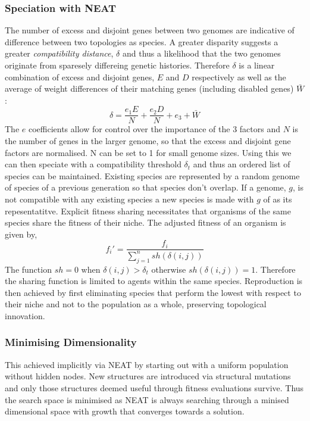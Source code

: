 \documentclass{article}
\begin{document}
\subsubsection*{Speciation with NEAT}
The number of excess and disjoint genes between two genomes are indicative of difference between two topologies as species.
A greater disparity suggests a greater \emph{compatibility distance}, $\delta$ and thus a likelihood that the two genomes originate from sparesely differeing genetic histories.
Therefore $\delta$ is a linear combination of excess and disjoint genes, $E$ and $D$ respectively as well as the average of weight differences of their matching genes (including disabled genes) $\bar{W}$:
\begin{equation*}
    \delta = \frac{e_1E}{N} + \frac{e_2D}{N} + e_3 + \bar{W}
\end{equation*}
The $e$ coefficients allow for control over the importance of the 3 factors and $N$ is the number of genes in the larger genome, so that the excess and disjoint gene factors are normalised.
N can be set to 1 for small genome sizes.
Using this we can then speciate with a compatibility threshold $\delta_t$ and thus an ordered list of species can be maintained.
Existing species are represented by a random genome of species of a previous generation so that species don't overlap.
If a genome, $g$, is not compatible with any existing species a new species is made with $g$ of as its repesentatitve.
Explicit fitness sharing necessitates that organisms of the same species share the fitness of their niche. The adjusted fitness of an organism is given by,
\begin{equation*}
    f_i' = \frac{f_i}{\sum_{j=1}^{n}sh(\delta(i,j))}
\end{equation*}
The function $sh=0$ when $\delta(i,j)>\delta_t$ otherwise $sh(\delta(i,j))=1$. Therefore the sharing function is limited to agents within the same species.
Reproduction is then achieved by first eliminating species that perform the lowest with respect to their niche and not to the population as a whole, preserving topological innovation.

\subsubsection*{Minimising Dimensionality}
This achieved implicitly via NEAT by starting out with a uniform population without hidden nodes.
New structures are introduced via structural mutations and only those structures deemed useful through fitness evaluations survive.
Thus the search space is minimised as NEAT is always searching through a minised dimensional space with growth that converges towards a solution.
\end{document}
